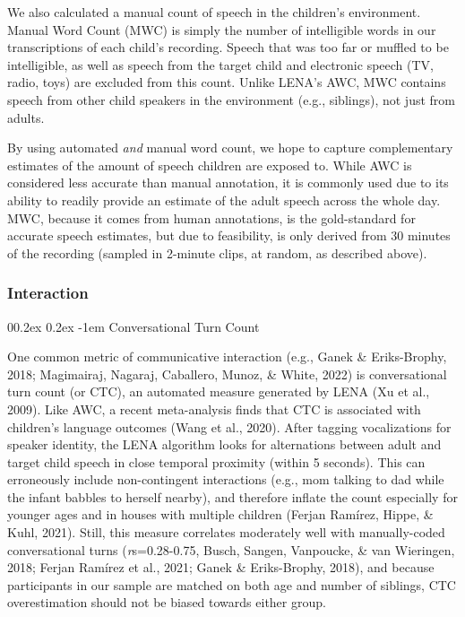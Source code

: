 \documentclass[
  man,floatsintext]{apa6}
\makeatletter
\let\oldparagraph\paragraph
\renewcommand{\paragraph}[1]{\oldparagraph{#1}\mbox{}}
\renewcommand{\paragraph}{\@startsection{paragraph}{4}{\parindent}%
  {0\baselineskip \@plus 0.2ex \@minus 0.2ex}%
  {-1em}%
  {\normalfont\normalsize\bfseries\itshape\typesectitle}}
\makeatother
\begin{document}
We also calculated a manual count of speech in the children's environment. Manual Word Count (MWC) is simply the number of intelligible words in our transcriptions of each child's recording. Speech that was too far or muffled to be intelligible, as well as speech from the target child and electronic speech (TV, radio, toys) are excluded from this count. Unlike LENA's AWC, MWC contains speech from other child speakers in the environment (e.g., siblings), not just from adults.

By using automated \emph{and} manual word count, we hope to capture complementary estimates of the amount of speech children are exposed to. While AWC is considered less accurate than manual annotation, it is commonly used due to its ability to readily provide an estimate of the adult speech across the whole day. MWC, because it comes from human annotations, is the gold-standard for accurate speech estimates, but due to feasibility, is only derived from 30 minutes of the recording (sampled in 2-minute clips, at random, as described above).

\hypertarget{interaction}{%
\subsubsection{Interaction}\label{interaction}}

\hypertarget{conversational-turn-count}{%
\paragraph{Conversational Turn Count}\label{conversational-turn-count}}

One common metric of communicative interaction (e.g., Ganek \& Eriks-Brophy, 2018; Magimairaj, Nagaraj, Caballero, Munoz, \& White, 2022) is conversational turn count (or CTC), an automated measure generated by LENA (Xu et al., 2009). Like AWC, a recent meta-analysis finds that CTC is associated with children's language outcomes (Wang et al., 2020). After tagging vocalizations for speaker identity, the LENA algorithm looks for alternations between adult and target child speech in close temporal proximity (within 5 seconds). This can erroneously include non-contingent interactions (e.g., mom talking to dad while the infant babbles to herself nearby), and therefore inflate the count especially for younger ages and in houses with multiple children (Ferjan Ramírez, Hippe, \& Kuhl, 2021). Still, this measure correlates moderately well with manually-coded conversational turns (\emph{r}s=0.28-0.75, Busch, Sangen, Vanpoucke, \& van Wieringen, 2018; Ferjan Ramírez et al., 2021; Ganek \& Eriks-Brophy, 2018), and because participants in our sample are matched on both age and number of siblings, CTC overestimation should not be biased towards either group.
\end{document}
